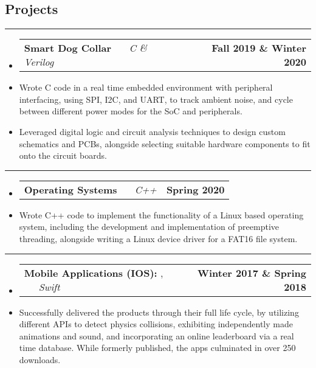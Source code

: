 \documentclass[10pt,letterpaper]{article}
\makeatletter
\newcommand{\header}[2]
{
	\begin{tabular*}{\linewidth}{l @{\extracolsep{\fill}} r}
		\hspace{-27pt} #1 & #2 \\
	\end{tabular*}
}
\newcommand{\sectionbreak}
{
	\vspace{-1.2em}
	\rule{\textwidth}{1.7pt}
	\vspace{-1.7em}
}
\makeatother
\begin{document}
\vspace{-1.5em}

\subsection*{Projects}
\sectionbreak


\begin{itemize}
	\item[]
		\header
		{
			\textbf{Smart Dog Collar}
			\emph{\smash{Relevant Course Project}} \ \ \ \footnotesize \emph{C \& Verilog}
		}
			{\textbf{Fall 2019 \& Winter 2020}}
		\item 
			Wrote C code in a real time embedded environment with peripheral interfacing, using SPI, I2C, and UART, to track ambient noise, and cycle between different power modes for the SoC and peripherals. 
		\item 
			Leveraged digital logic and circuit analysis techniques to design custom schematics and PCBs, alongside selecting suitable hardware components to fit onto the circuit boards.

\end{itemize}

\hrule

\begin{itemize}
	\item[]
		\header
		{
			\textbf{Operating Systems}
			\emph{\smash{Relevant Course Project}} \ \ \ \footnotesize \emph{C++}
		}
			{\textbf{Spring 2020}}
		\item 
			Wrote C++ code to implement the functionality of a Linux based operating system, including the development and implementation of preemptive threading, alongside writing a Linux device driver for a FAT16 file system.

\end{itemize}
\hrule
\begin{itemize}
	\item[]
		\header
		{
			\textbf{Mobile Applications (IOS): }
			\href{https://appadvice.com/app/round-bound/1369632746}{\emph{\underline{\smash{Round 'a Bound}}}}, 
			\href{https://appadvice.com/app/tic-tac-emoji/1346934986}{\emph{\underline{\smash{Tic-Tac Emoji}}}} \ \ \ \footnotesize  \emph{Swift}
		}
			{\textbf{Winter 2017 \& Spring 2018}}
		\item 
			Successfully delivered the products through their full life cycle, by utilizing different APIs to detect physics collisions, exhibiting independently made animations and sound, and incorporating an online leaderboard via a real time database. While formerly published, the apps culminated in over 250 downloads.
\end{itemize}
\end{document}
